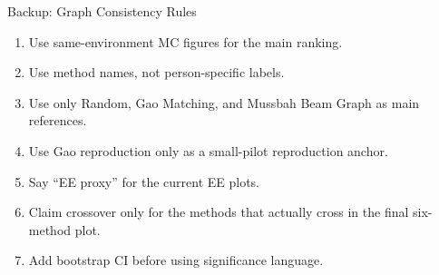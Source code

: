 \documentclass[10pt,aspectratio=169]{beamer}
\newenvironment{tightenumerate}{%
    \begin{enumerate}
        \setlength{\itemsep}{1pt}
        \setlength{\parskip}{0pt}
        \setlength{\parsep}{0pt}
}{%
    \end{enumerate}
}
\begin{document}
\begin{frame}{Backup: Graph Consistency Rules}
    \small
    \begin{tightenumerate}
        \item Use same-environment MC figures for the main ranking.
        \item Use method names, not person-specific labels.
        \item Use only Random, Gao Matching, and Mussbah Beam Graph as main references.
        \item Use Gao reproduction only as a small-pilot reproduction anchor.
        \item Say ``EE proxy'' for the current EE plots.
        \item Claim crossover only for the methods that actually cross in the final six-method plot.
        \item Add bootstrap CI before using significance language.
    \end{tightenumerate}
\end{frame}
\end{document}
